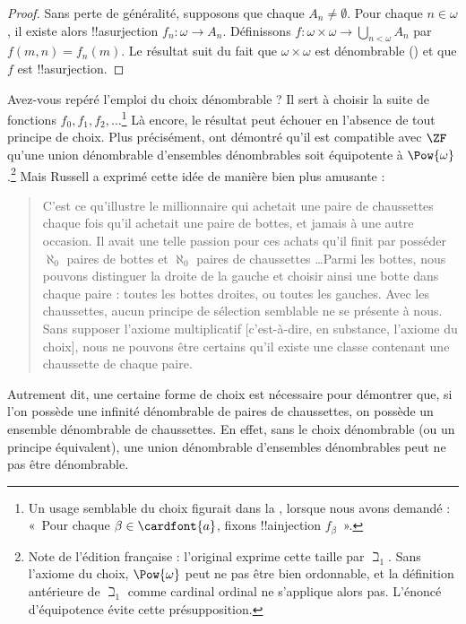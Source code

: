 \documentclass[../../../include/open-logic-section]{subfiles}
\begin{document}
\begin{ex}
\begin{proof}
Sans perte de généralité, supposons
que chaque $A_n \neq \emptyset$.
Pour chaque $n \in \omega$, il existe
alors !!a{surjection}
$f_n \colon \omega \to A_n$.
Définissons
$f \colon \omega \times \omega
\to \bigcup_{n < \omega} A_n$
par $f(m,n)=f_n(m)$.
Le résultat suit du fait que
$\omega \times \omega$ est
dénombrable
()
et que $f$ est !!a{surjection}.
\end{proof}
\noindent
Avez-vous repéré l'emploi du choix
dénombrable ? Il sert à choisir
la suite de fonctions
$f_0, f_1, f_2, \dots$\footnote{
Un usage semblable du choix figurait
dans la
,
lorsque nous avons demandé :
«~Pour chaque
$\beta \in \cardfont{a}$,
fixons !!a{injection} $f_\beta$~».}
Là encore, le résultat peut échouer
en l'absence de tout principe de choix.
Plus précisément,
\citet{FefermanLevy1963} ont démontré
qu'il est compatible avec $\ZF$
qu'une union dénombrable d'ensembles
dénombrables soit équipotente à
$\Pow{\omega}$.\footnote{Note de l'édition
française : l'original exprime cette taille
par $\beth_1$. Sans l'axiome du choix,
$\Pow{\omega}$ peut ne pas être
bien ordonnable, et la définition
antérieure de $\beth_1$ comme cardinal
ordinal ne s'applique alors pas.
L'énoncé d'équipotence évite cette
présupposition.}
Mais Russell a exprimé cette idée
de manière bien plus amusante :
\begin{quote}
	C'est ce qu'illustre le millionnaire
	qui achetait une paire de chaussettes
	chaque fois qu'il achetait une paire
	de bottes, et jamais à une autre
	occasion. Il avait une telle passion
	pour ces achats qu'il finit par
	posséder $\aleph_0$ paires de bottes
	et $\aleph_0$ paires de chaussettes
	\dots\@ Parmi les bottes, nous
	pouvons distinguer la droite de la
	gauche et choisir ainsi une botte
	dans chaque paire : toutes les bottes
	droites, ou toutes les gauches.
	Avec les chaussettes, aucun principe
	de sélection semblable ne se présente
	à nous. Sans supposer l'axiome
	multiplicatif [c'est-à-dire,
	en substance, l'axiome du choix],
	nous ne pouvons être certains
	qu'il existe une classe contenant
	une chaussette de chaque paire.
	\citep[p.~126]{Russell1919}
\end{quote}
Autrement dit, une certaine forme
de choix est nécessaire pour
démontrer que, si l'on possède
une infinité dénombrable de paires
de chaussettes, on possède un ensemble
dénombrable de chaussettes.
En effet, sans le choix dénombrable
(ou un principe équivalent), une union
dénombrable d'ensembles dénombrables
peut ne pas être dénombrable.
\end{ex}
\end{document}
